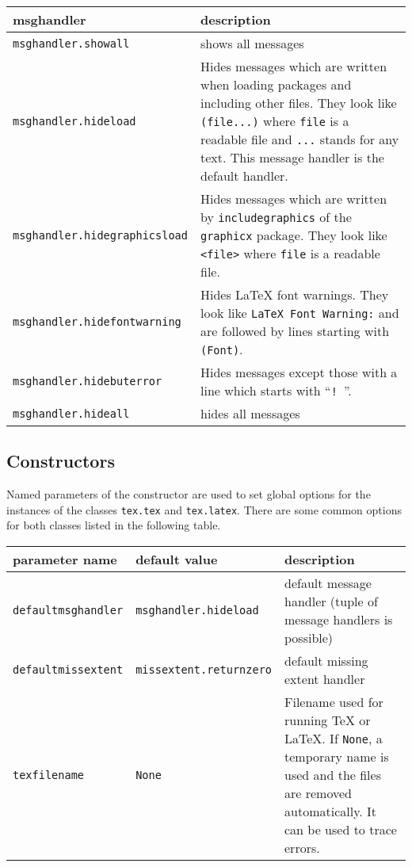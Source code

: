 \begin{description}
\bigskip
\begin{tabularx}{\linewidth}{l>{\raggedright\arraybackslash}X}
msghandler&description\\
\hline
\texttt{msghandler.showall}&shows all messages\\
\texttt{msghandler.hideload}&Hides messages which are written when loading
packages and including other files. They look like \texttt{(file...)}
where \texttt{file} is a readable file and \texttt{...} stands for any
text. This message handler is the default handler.\\
\texttt{msghandler.hidegraphicsload}&Hides messages which are written by
\texttt{includegraphics} of the \texttt{graphicx} package. They look like
\texttt{<file>} where \texttt{file} is a readable file.\\
\texttt{msghandler.hidefontwarning}&Hides \LaTeX{} font warnings. They
look like \texttt{LaTeX Font Warning:} and are followed by lines starting
with \texttt{(Font)}.\\
\texttt{msghandler.hidebuterror}&Hides messages except those
with a line which starts with ``\texttt{! }''.\\
\texttt{msghandler.hideall}&hides all messages\\
\end{tabularx}
\end{description}


\subsection{Constructors}
Named parameters of the constructor are used to set global options for
the instances of the classes \verb|tex.tex| and \verb|tex.latex|.
There are some common options for both classes listed in the following
table.

\bigskip
\begin{tabularx}{\linewidth}{ll>{\raggedright\arraybackslash}X}
parameter name&default value&description\\
\hline
\texttt{defaultmsghandler}&\texttt{msghandler.hideload}&default
message handler (tuple of message handlers is possible)\\
\texttt{defaultmissextent}&\texttt{missextent.returnzero}&default missing extent handler\\
\texttt{texfilename}&\texttt{None}&Filename used for running \TeX{} or
\LaTeX. If \texttt{None}, a temporary name is used and the files are
removed automatically. It can be used to trace errors.\\
\end{tabularx}
\bigskip

